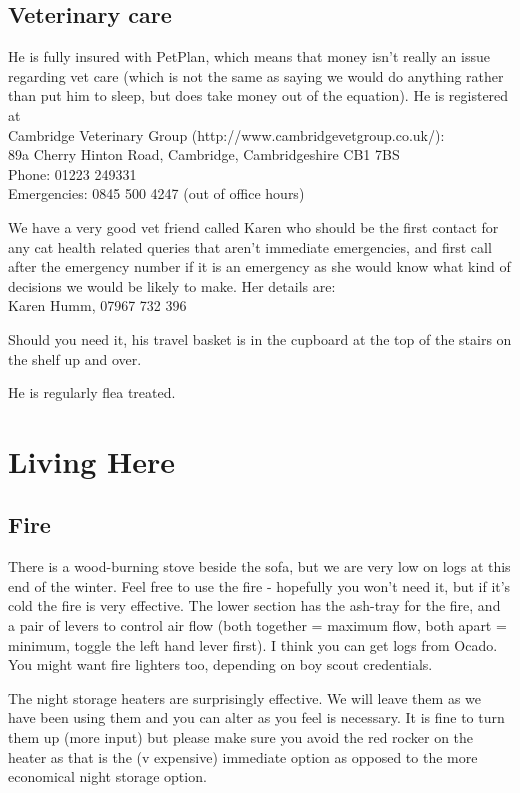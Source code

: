 \documentclass[11pt]{article}
\begin{document}
\subsection*{Veterinary care}
He is fully insured with PetPlan, which means that money isn't really an issue regarding vet care (which is not the same as saying we would do anything rather than put him to sleep, but does take money out of the equation).  He is registered at \\Cambridge Veterinary Group (http://www.cambridgevetgroup.co.uk/): \\89a Cherry Hinton Road, Cambridge, Cambridgeshire CB1 7BS
\\Phone: 01223 249331
\\Emergencies: 0845 500 4247 (out of office hours)

We have a very good vet friend called Karen who should be the first contact for any cat health related queries that aren't immediate emergencies, and first call after the emergency number if it is an emergency as she would know what kind of decisions we would be likely to make. Her details are:
\\Karen Humm, 07967 732 396

Should you need it, his travel basket is in the cupboard at the top of the stairs on the shelf up and over.

He is regularly flea treated.  
\newpage
\section{Living Here}
\subsection*{Fire}
There is a wood-burning stove beside the sofa, but we are very low on logs at this end of the winter. Feel free to use the fire - hopefully you won't need it, but if it's cold the fire is very effective. The lower section has the ash-tray for the fire, and a pair of levers to control air flow (both together = maximum flow, both apart = minimum, toggle the left hand lever first). I think you can get logs from Ocado. You might want fire lighters too, depending on boy scout credentials.

The night storage heaters are surprisingly effective. We will leave them as we have been using them and you can alter as you feel is necessary.  It is fine to turn them up (more input) but please make sure you avoid the red rocker on the heater as that is the (v expensive) immediate option as opposed to the more economical night storage option.  
\end{document}
